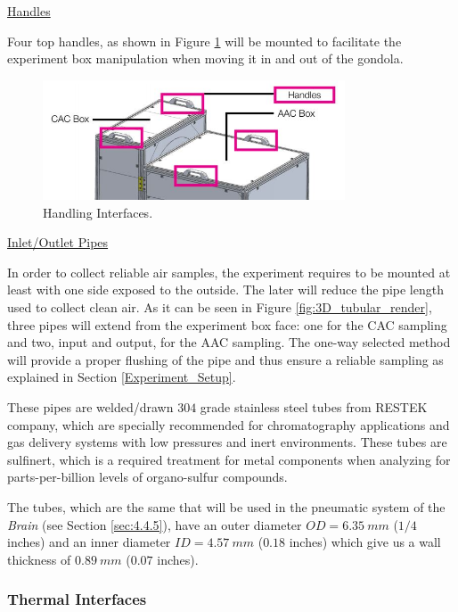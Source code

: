 \bigskip
\underline{Handles}

\smallskip
Four top handles, as shown in Figure \ref{fig:handles} will be mounted to facilitate the experiment box manipulation when moving it in and out of the gondola.

\begin{figure}[H]
    \centering
    \includegraphics[width=0.8\textwidth]{4-experiment-design/img/Mechanical/handles.jpg}
    \caption{Handling Interfaces.}
    \label{fig:handles}
\end{figure}

\bigskip
\underline{Inlet/Outlet Pipes}
\label{subsec:pipes}

\smallskip
In order to collect reliable air samples, the experiment requires to be mounted at least with one side exposed to the outside. The later will reduce the pipe length used to collect clean air. As it can be seen in Figure \ref{fig:3D_tubular_render}, three pipes will extend from the experiment box face: one for the CAC sampling and two, input and output, for the AAC sampling. The one-way selected method will provide a proper flushing of the pipe and thus ensure a reliable sampling as explained in Section \ref{Experiment_Setup}.

These pipes are welded/drawn $304$ grade stainless steel tubes from RESTEK company, which are specially recommended for chromatography applications and gas delivery systems with low pressures and inert environments. These tubes are sulfinert, which is a required treatment for metal components when analyzing for parts-per-billion levels of organo-sulfur compounds.

The tubes, which are the same that will be used in the pneumatic system of the \emph{Brain} (see Section \ref{sec:4.4.5}), have an outer diameter $OD = 6.35\ mm$ ($1/4$ inches) and an inner diameter $ID = 4.57\ mm$ ($0.18$ inches) which give us a wall thickness of $0.89\ mm$ ($0.07$ inches).

\subsubsection{Thermal Interfaces}
\label{sec:4.2.2}

